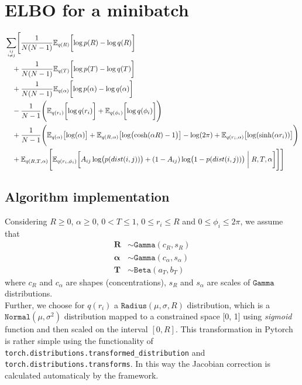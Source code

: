 \documentclass{article}
\renewcommand{\v}[1]{\bm{#1}}
\newcommand{\E}{\mathbb{E}}
\begin{document}
\section{ELBO for a minibatch}
\begin{equation}
\begin{split}
& \sum_{ij \atop i \neq j} \Biggl[ \frac{1}{N (N - 1)} \E_{q(R)}\biggl[\log p(R) - \log q(R)\biggr]  \\
& \quad + \frac{1}{N (N - 1)} \E_{q(T)}\biggl[\log p(T) - \log q(T)\biggr]  \\
& \quad + \frac{1}{N (N - 1)} \E_{q(\alpha)}\biggl[\log p(\alpha) - \log q(\alpha)\biggr]  \\
& \quad - \frac{1}{N-1} \Biggl( \E_{q(r_i)} \biggl[\log q(r_i) \biggr] + \E_{q(\phi_i)} \biggl[\log q(\phi_i) \biggr] \Biggr)\\
& \quad + \frac{1}{N-1} \Biggl( \E_{q(\alpha)}\bigl[\log (\alpha) \bigr] + \E_{q(R,\alpha)}\bigl[\log \bigl( \cosh (\alpha R) - 1\bigr) \bigr] - \log(2\pi) + \E_{q(r_i, \alpha)} \bigl[ \log(\sinh(\alpha r_i)) \bigr]\Biggr)\\
& \quad + \E_{q( R,T,\alpha)} \Biggl[ 
\E_{q(r_i, \phi_i)} \biggl[ 
A_{ij} \log \bigl(p(dist(i,j))\bigr) + (1-A_{ij}) \log \bigl(1 - p(dist(i,j))\bigr)  \biggm\vert R,T,\alpha \biggr] \Biggr] \Biggr]
\end{split}
\end{equation}

\subsection{Algorithm implementation}

Considering $R \geq 0$, $\alpha \geq 0$, $ 0 < T \leq 1$, $0 \leq r_i \leq R$ and $0 \leq \phi_i \leq 2\pi$, we assume that
\begin{align*}
\v{R} &\sim \mathtt{Gamma}(c_R, s_R)\\
\v{\alpha} &\sim \mathtt{Gamma}(c_\alpha, s_\alpha)\\
\v{T} &\sim \mathtt{Beta}(a_T, b_T)
\end{align*}
where $c_R$ and $c_\alpha$ are shapes (concentrations), $s_R$ and $s_\alpha$ are scales of $\mathtt{Gamma}$ distributions.\\

Further, we choose for $q(r_i)$ a $\mathtt{Radius}(\mu, \sigma, R)$ distribution, which is a $\mathtt{Normal}(\mu, \sigma^2)$ distribution mapped to a constrained space [0, 1] using \textit{sigmoid} function and then scaled on the interval $[0,R]$. This transformation in Pytorch is rather simple using the functionality of \verb|torch.distributions.transformed_distribution| and \verb|torch.distributions.transforms|. In this way the Jacobian correction is calculated automaticaly by the framework.\\
\end{document}
